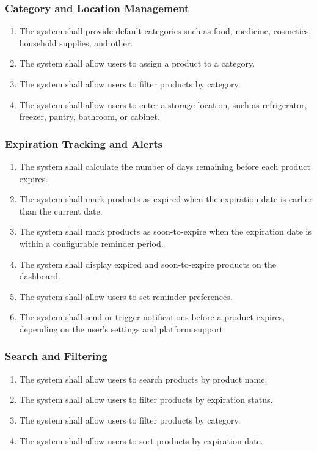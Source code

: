 \documentclass[12pt]{article}
\begin{document}
\subsubsection{Category and Location Management}
\begin{enumerate}[label=FR-\arabic*. ,resume]
    \item The system shall provide default categories such as food, medicine, cosmetics, household supplies, and other.
    \item The system shall allow users to assign a product to a category.
    \item The system shall allow users to filter products by category.
    \item The system shall allow users to enter a storage location, such as refrigerator, freezer, pantry, bathroom, or cabinet.
\end{enumerate}

\subsubsection{Expiration Tracking and Alerts}
\begin{enumerate}[label=FR-\arabic*. ,resume]
    \item The system shall calculate the number of days remaining before each product expires.
    \item The system shall mark products as expired when the expiration date is earlier than the current date.
    \item The system shall mark products as soon-to-expire when the expiration date is within a configurable reminder period.
    \item The system shall display expired and soon-to-expire products on the dashboard.
    \item The system shall allow users to set reminder preferences.
    \item The system shall send or trigger notifications before a product expires, depending on the user's settings and platform support.
\end{enumerate}

\subsubsection{Search and Filtering}
\begin{enumerate}[label=FR-\arabic*. ,resume]
    \item The system shall allow users to search products by product name.
    \item The system shall allow users to filter products by expiration status.
    \item The system shall allow users to filter products by category.
    \item The system shall allow users to sort products by expiration date.
\end{enumerate}
\end{document}
